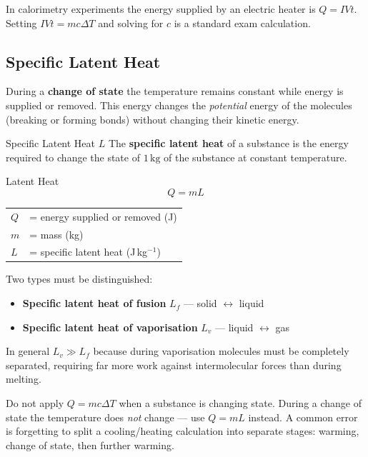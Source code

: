 \begin{tipbox}
In calorimetry experiments the energy supplied by an electric heater is
$Q = IVt$. Setting $IVt = mc\Delta T$ and solving for $c$ is a standard exam
calculation.
\end{tipbox}

\subsection{Specific Latent Heat}

During a \textbf{change of state} the temperature remains constant while energy is
supplied or removed. This energy changes the \emph{potential} energy of the molecules
(breaking or forming bonds) without changing their kinetic energy.

\begin{defnbox}{Specific Latent Heat $L$}
The \textbf{specific latent heat} of a substance is the energy required to change the
state of $1\,\mathrm{kg}$ of the substance at constant temperature.
\end{defnbox}

\begin{formulabox}{Latent Heat}
\begin{equation}
  Q = mL
\end{equation}
\begin{tabular}{ll}
$Q$ & = energy supplied or removed (J) \\
$m$ & = mass (kg) \\
$L$ & = specific latent heat (J\,kg$^{-1}$) \\
\end{tabular}
\end{formulabox}

Two types must be distinguished:
\begin{itemize}
  \item \textbf{Specific latent heat of fusion} $L_f$ — solid $\leftrightarrow$ liquid
  \item \textbf{Specific latent heat of vaporisation} $L_v$ — liquid $\leftrightarrow$ gas
\end{itemize}

In general $L_v \gg L_f$ because during vaporisation molecules must be completely
separated, requiring far more work against intermolecular forces than during melting.

\begin{warnbox}
Do not apply $Q = mc\Delta T$ when a substance is changing state. During a change of
state the temperature does \emph{not} change — use $Q = mL$ instead. A common error is
forgetting to split a cooling/heating calculation into separate stages: warming,
change of state, then further warming.
\end{warnbox}

